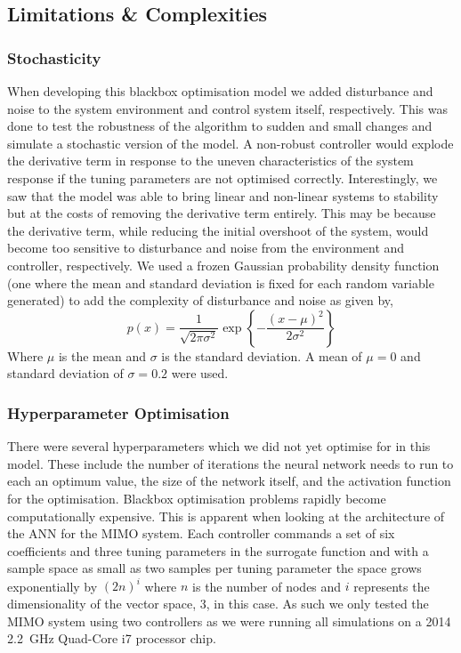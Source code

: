 \documentclass[conference]{IEEEtran}
\theoremstyle{definition}
\begin{document}
\subsection{Limitations \& Complexities}
\subsubsection{Stochasticity}
\noindent When developing this blackbox optimisation model we added disturbance and noise to the system environment and control system itself, respectively. This was done to test the robustness of the algorithm to sudden and small changes and simulate a stochastic version of the model. A non-robust controller would explode the derivative term in response to the uneven characteristics of the system response if the tuning parameters are not optimised correctly. Interestingly, we saw that the model was able to bring linear and non-linear systems to stability but at the costs of removing the derivative term entirely. This may be because the derivative term, while reducing the initial overshoot of the system, would become too sensitive to disturbance and noise from the environment and controller, respectively. We used a frozen Gaussian probability density function (one where the mean and standard deviation is fixed for each random variable generated) to add the complexity of disturbance and noise as given by,
\begin{equation}
    p(x) = \frac{1}{\sqrt{2\pi \sigma^2}} \exp{\left\{-\frac{ (x-\mu)^2}{2\sigma^2} \right\}}
\end{equation}
\vspace{1mm}
\noindent Where $\mu$ is the mean and $\sigma$ is the standard deviation. A mean of $\mu = 0$ and standard deviation of $\sigma = 0.2$ were used. 

\vspace{2mm}
\subsubsection{Hyperparameter Optimisation}
\noindent There were several hyperparameters which we did not yet optimise for in this model. These include the number of iterations the neural network needs to run to each an optimum value, the size of the network itself, and the activation function for the optimisation. Blackbox optimisation problems rapidly become computationally expensive. This is apparent when looking at the architecture of the ANN for the MIMO system. Each controller commands a set of six coefficients and three tuning parameters in the surrogate function and with a sample space as small as two samples per tuning parameter the space grows exponentially by $(2n)^i$ where $n$ is the number of nodes and $i$ represents the dimensionality of the vector space, 3, in this case. As such we only tested the MIMO system using two controllers as we were running all simulations on a 2014 \SI{2.2}{GHz} Quad-Core i7 processor chip. \\
\end{document}
